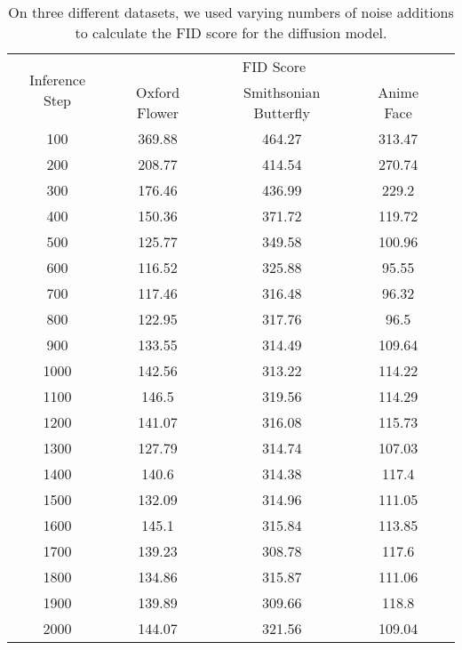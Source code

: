 \begin{table}
    \centering

\begin{tabular}{ |c|c|c|c|c| } 
 \hline
 \multirow{2}{*}{Inference Step} & \multicolumn{3}{|c|}{FID Score}  \\
 \cline{2-4}
                    & Oxford Flower & Smithsonian Butterfly & Anime Face  \\  
 \hline

 100 & 369.88 & 464.27 & 313.47 \\
 \hline
 200 & 208.77 & 414.54 & 270.74 \\
 \hline
 300 & 176.46 & 436.99 & 229.2 \\
 \hline
 400 & 150.36 & 371.72 & 119.72 \\
 \hline
 500 & 125.77 & 349.58 & 100.96 \\
 \hline
 600 & 116.52 & 325.88 & 95.55 \\
 \hline
 700 & 117.46 & 316.48 & 96.32 \\
 \hline
 800 & 122.95 & 317.76 & 96.5 \\
 \hline
 900 & 133.55 & 314.49 & 109.64 \\
 \hline
 1000 & 142.56 & 313.22 & 114.22 \\
 \hline
 1100 & 146.5 & 319.56 & 114.29 \\
 \hline
 1200 & 141.07 & 316.08 & 115.73 \\
 \hline
 1300 & 127.79 & 314.74 & 107.03 \\
 \hline
 1400 & 140.6 & 314.38 & 117.4 \\
 \hline
 1500 & 132.09 & 314.96 & 111.05 \\
 \hline
 1600 & 145.1 & 315.84 & 113.85 \\
 \hline
 1700 & 139.23 & 308.78 & 117.6 \\
 \hline
 1800 & 134.86 & 315.87 & 111.06 \\
 \hline
 1900 & 139.89 & 309.66 & 118.8 \\
 \hline
 2000 & 144.07 & 321.56 & 109.04 \\
 \hline
 


\end{tabular}

    \caption{On three different datasets, we used varying numbers of noise additions to calculate the FID score for the diffusion model.}
    \label{table:fid_three_dataset}
\end{table}